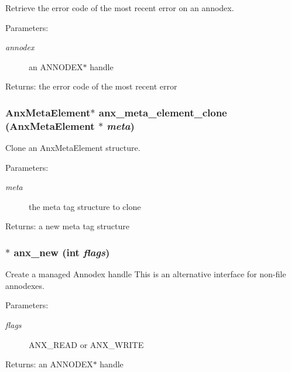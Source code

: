 Retrieve the error code of the most recent error on an annodex. 

\begin{Desc}
\item[Parameters:]
\begin{description}
\item[{\em annodex}]an ANNODEX$\ast$ handle \end{description}
\end{Desc}
\begin{Desc}
\item[Returns:]the error code of the most recent error \end{Desc}
\subsubsection{\setlength{\rightskip}{0pt plus 5cm}Anx\-Meta\-Element$\ast$ anx\_\-meta\_\-element\_\-clone (Anx\-Meta\-Element $\ast$ {\em meta})}\label{anx__general_8h_a25}


Clone an Anx\-Meta\-Element structure. 

\begin{Desc}
\item[Parameters:]
\begin{description}
\item[{\em meta}]the meta tag structure to clone \end{description}
\end{Desc}
\begin{Desc}
\item[Returns:]a new meta tag structure \end{Desc}
\subsubsection{$\ast$ anx\_\-new (int {\em flags})}\label{anx__general_8h_a5}


Create a managed Annodex handle This is an alternative interface for non-file annodexes. 

\begin{Desc}
\item[Parameters:]
\begin{description}
\item[{\em flags}]ANX\_\-READ or ANX\_\-WRITE \end{description}
\end{Desc}
\begin{Desc}
\item[Returns:]an ANNODEX$\ast$ handle \end{Desc}
